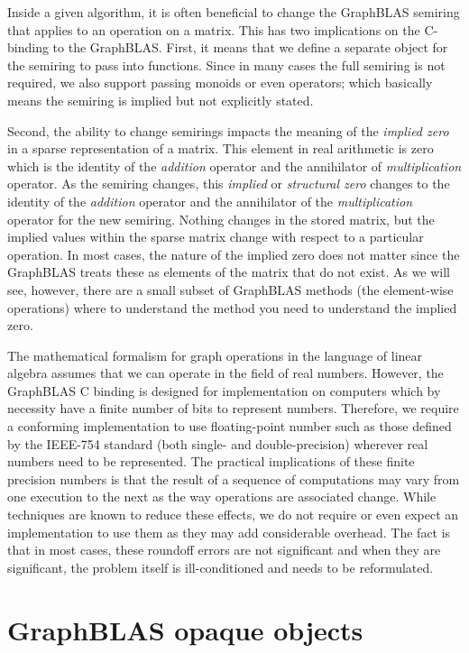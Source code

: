 Inside a given algorithm, it is often beneficial to change the GraphBLAS semiring
that applies to an operation on a matrix.  This has two 
implications on the C-binding to the GraphBLAS.  First,
it means that we define a separate object for the semiring 
to pass into functions.  Since in many cases the full
semiring is not required, we also support passing monoids or
even operators; which basically means the semiring is implied but not 
explicitly stated.

Second, the ability to change semirings impacts the meaning of 
the \emph{implied zero} in a sparse representation of a matrix.
This element in real arithmetic is zero which is the 
identity of the \emph{addition} operator and the annihilator of
\emph{multiplication} operator.   As the semiring changes, this 
\emph{implied} or \emph{structural zero} changes to the identity of 
the \emph{addition} operator and the annihilator of the \emph{multiplication} 
operator for the new semiring.   Nothing changes in the
stored matrix, but the implied values within the sparse matrix change
with respect to a particular operation.  In most cases, the nature
of the implied zero does not matter since the GraphBLAS treats these
as elements of the matrix that do not exist.  As we will see, however,
there are a small subset of GraphBLAS methods 
(the element-wise operations) where to understand 
the method you need to understand the implied zero.

The mathematical formalism for graph operations in the language of 
linear algebra assumes that we can operate in the field of real numbers. 
However, the GraphBLAS C binding is designed for implementation on computers 
which by necessity have a finite number of bits to represent numbers. 
Therefore, we require a conforming implementation to use floating-point 
number such as those defined by the IEEE-754 standard (both single- and double-precision) 
wherever real numbers need to be represented. The practical implications of 
these finite precision numbers is that the result of a sequence of 
computations may vary from one execution to the next as the way 
operations are associated change. While techniques are known to 
reduce these effects, we do not require or even expect an implementation 
to use them as they may add considerable overhead. The fact is that in most 
cases, these roundoff errors are not significant and when they are significant, 
the problem itself is ill-conditioned and needs to be reformulated.

\section{GraphBLAS opaque objects}

